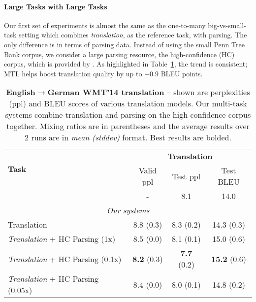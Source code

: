 \paragraph{Large Tasks with Large Tasks}
\label{subsub:ll}
Our first set of experiments is almost the same as the one-to-many
big-vs-small-task setting
which combines {\it translation}, as the reference
task, with parsing. The only difference is in terms of parsing data. Instead of using the
small Penn Tree Bank corpus, we consider a large parsing resource, the
high-confidence (HC) corpus, which is provided by \citet{vinyals15grammar}.
As highlighted in Table~\ref{t:big_big_translation}, the
trend is consistent; MTL helps boost translation quality by up
to +$0.9$ BLEU points. 

\begin{table}[tbh!]
\centering
\begin{tabular}{l|c|c|c}
\multirow{ 2}{*}{\bf{Task}} & \multicolumn{3}{c}{{\bf Translation}}\\
  \cline{2-4}
  & Valid ppl & Test ppl & Test BLEU\\
  \hline
\citep{luong15attn} & - & 8.1 & 14.0 \\
  \hline
\multicolumn{4}{c}{{\it Our systems}} \\
  \hline
Translation & 8.8 (0.3) & 8.3 (0.2) & 14.3 (0.3)\\
  \hline
{\it Translation} + HC Parsing (1x) &  8.5 (0.0) & 8.1 (0.1) & 15.0 (0.6) \\
{\it Translation} + HC Parsing (0.1x) &  {\bf 8.2} (0.3) & {\bf 7.7} (0.2) &
{\bf 15.2} (0.6)\\
{\it Translation} + HC Parsing (0.05x) &  8.4 (0.0) & 8.0 (0.1) & 14.8 (0.2) \\
\end{tabular}
\caption[Translation \& Large-Corpus parsing
results]{{\bf English$\rightarrow$German WMT'14 translation} -- shown are
perplexities (ppl) and BLEU scores of various translation models. Our
multi-task systems combine translation and parsing on the
high-confidence corpus together. Mixing
ratios are in parentheses and the average results over 2 runs are in {\it
mean (stddev)} format. Best results are bolded.}
\label{t:big_big_translation}
\end{table}


